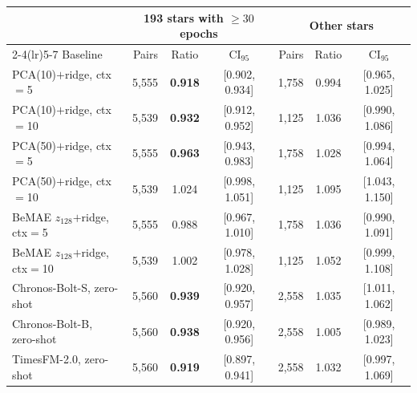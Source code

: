 \begin{tabular}{lrcc@{\hskip 1.2em}rcc}
  \toprule
  & \multicolumn{3}{c}{193 stars with $\geq\!30$ epochs} & \multicolumn{3}{c}{Other stars} \\
  \cmidrule(lr){2-4}\cmidrule(lr){5-7}
  Baseline & Pairs & Ratio & CI$_{95}$ & Pairs & Ratio & CI$_{95}$ \\
  \midrule
  PCA(10)$+$ridge, ctx$=$5 & 5{,}555 & \textbf{0.918} & [0.902, 0.934] & 1{,}758 & 0.994 & [0.965, 1.025] \\
  PCA(10)$+$ridge, ctx$=$10 & 5{,}539 & \textbf{0.932} & [0.912, 0.952] & 1{,}125 & 1.036 & [0.990, 1.086] \\
  PCA(50)$+$ridge, ctx$=$5 & 5{,}555 & \textbf{0.963} & [0.943, 0.983] & 1{,}758 & 1.028 & [0.994, 1.064] \\
  PCA(50)$+$ridge, ctx$=$10 & 5{,}539 & 1.024 & [0.998, 1.051] & 1{,}125 & 1.095 & [1.043, 1.150] \\
  BeMAE $z_{128}$$+$ridge, ctx$=$5 & 5{,}555 & 0.988 & [0.967, 1.010] & 1{,}758 & 1.036 & [0.990, 1.091] \\
  BeMAE $z_{128}$$+$ridge, ctx$=$10 & 5{,}539 & 1.002 & [0.978, 1.028] & 1{,}125 & 1.052 & [0.999, 1.108] \\
  Chronos-Bolt-S, zero-shot & 5{,}560 & \textbf{0.939} & [0.920, 0.957] & 2{,}558 & 1.035 & [1.011, 1.062] \\
  Chronos-Bolt-B, zero-shot & 5{,}560 & \textbf{0.938} & [0.920, 0.956] & 2{,}558 & 1.005 & [0.989, 1.023] \\
  TimesFM-2.0, zero-shot & 5{,}560 & \textbf{0.919} & [0.897, 0.941] & 2{,}558 & 1.032 & [0.997, 1.069] \\
  \bottomrule
\end{tabular}
